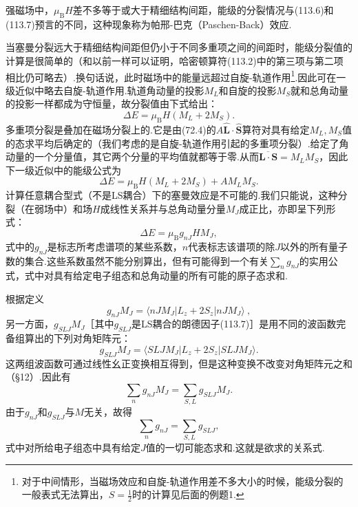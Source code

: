 强磁场中，$\mu_\mathrm{B}H$差不多等于或大于精细结构间距，能级的分裂情况与(113.6)和(113.7)预言的不同，这种现象称为帕邢-巴克（Paschen-Back）效应.

当塞曼分裂远大于精细结构间距但仍小于不同多重项之间的间距时，能级分裂值的计算是很简单的（和以前一样可以证明，哈密顿算符(113.2)中的第三项与第二项相比仍可略去）.换句话说，此时磁场中的能量远超过自旋-轨道作用\footnote{对于中间情形，当磁场效应和自旋-轨道作用差不多大小的时候，能级分裂的一般表式无法算出，$S=\frac{1}{2}$时的计算见后面的例题1.}.因此可在一级近似中略去自旋-轨道作用.轨道角动量的投影$M_L$和自旋的投影$M_S$就和总角动量的投影一样都成为守恒量，故分裂值由下式给出：
\begin{equation}
  \Delta E=\mu_\mathrm{B}H(M_L+2M_S).
\end{equation}
多重项分裂是叠加在磁场分裂上的.它是由(72.4)的$A\hat{\boldsymbol{L}}\cdot\hat{\boldsymbol{S}}$算符对具有给定$M_L,M_S$值的态求平均后确定的（我们考虑的是自旋-轨道作用引起的多重项分裂）.给定了角动量的一个分量值，其它两个分量的平均值就都等于零.从而$\overline{\boldsymbol{L}\cdot\boldsymbol{S}}=M_LM_S$，因此下一级近似中的能级公式为
\begin{equation}
  \Delta E=\mu_\mathrm{B}H(M_L+2M_S)+AM_LM_S.
\end{equation}
计算任意耦合型式（不是LS耦合）下的塞曼效应是不可能的.我们只能说，这种分裂（在弱场中）和场$H$成线性关系并与总角动量分量$M_J$成正比，亦即呈下列形式：
\begin{equation}
  \Delta E=\mu_\mathrm{B}g_{nJ}HM_J,
\end{equation}
式中的$g_{nJ}$是标志所考虑谱项的某些系数，$n$代表标志该谱项的除$J$以外的所有量子数的集合.这些系数虽然不能分别算出，但有可能得到一个有关$\sum_n g_{nJ}$的实用公式，式中对具有给定电子组态和总角动量的所有可能的原子态求和.

根据定义
\begin{equation*}
  g_{nJ}M_J=\langle nJM_J|L_z+2S_z|nJM_J\rangle\>,
\end{equation*}
另一方面，$g_{SLJ}M_J$［其中$g_{SLJ}$是LS耦合的朗德因子(113.7)］是用不同的波函数完备组算出的下列对角矩阵元：
\begin{equation*}
  g_{SLJ}M_J=\langle SLJM_J|L_z+2S_z|SLJM_J\rangle.
\end{equation*}
这两组波函数可通过线性幺正变换相互得到，但是这种变换不改变对角矩阵元之和（§12）.因此有
\begin{equation*}
  \sum_n g_{nJ}M_J=\sum_{S,L}g_{SLJ}M_J.
\end{equation*}
由于$g_{nJ}$和$g_{SLJ}$与$M$无关，故得
\begin{equation}
  \sum_n g_{nJ}=\sum_{S,L}g_{SLJ},
\end{equation}
式中对所给电子组态中具有给定$J$值的一切可能态求和.这就是欲求的关系式.

